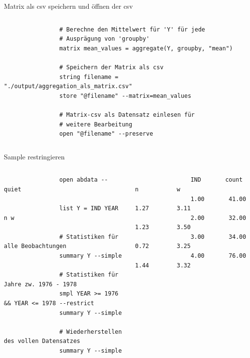 \documentclass{beamer}[11pt]
\begin{document}
\begin{frame}[fragile]{Matrix als csv speichern und öffnen der csv}
	\begin{columns}[T] %
		\small
		\begin{column}{.7\textwidth}
			\begin{verbatim}
				# Berechne den Mittelwert für 'Y' für jede
				# Ausprägung von 'groupby'
				matrix mean_values = aggregate(Y, groupby, "mean")

				# Speichern der Matrix als csv
				string filename = "./output/aggregation_als_matrix.csv"
				store "@filename" --matrix=mean_values

				# Matrix-csv als Datensatz einlesen für
				# weitere Bearbeitung
				open "@filename" --preserve
			\end{verbatim}
		\end{column}
	\end{columns}
\end{frame}


\begin{frame}[fragile]{Sample restringieren}
	\begin{columns}[T] %
		\scriptsize
		\begin{column}{.62\textwidth}
			\begin{verbatim}
				open abdata --quiet

				list Y = IND YEAR n w

				# Statistiken für alle Beobachtungen
				summary Y --simple

				# Statistiken für Jahre zw. 1976 - 1978
				smpl YEAR >= 1976 && YEAR <= 1978 --restrict
				summary Y --simple

				# Wiederherstellen des vollen Datensatzes
				summary Y --simple
			\end{verbatim}
		\end{column}

		\begin{column}{.4\textwidth}
			\tiny
			\begin{verbatim}
				IND       count           n           w
				1.00       41.00        1.27        3.11
				2.00       32.00        1.23        3.50
				3.00       34.00        0.72        3.25
				4.00       76.00        1.44        3.32
			\end{verbatim}
	  \end{column}
	\end{columns}
\end{frame}
\end{document}
